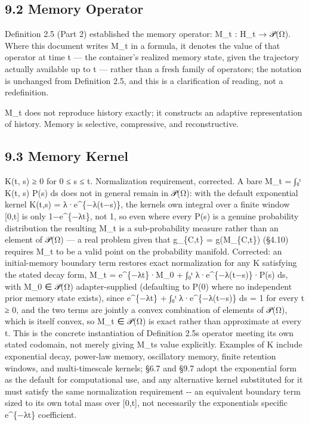 \documentclass[
]{article}
\begin{document}
\hypertarget{memory-operator}{%
\subsection{9.2 Memory Operator}\label{memory-operator}}

Definition 2.5 (Part 2) established the memory operator: M\_t : H\_t →
𝒫(Ω). Where this document writes M\_t in a formula, it denotes the value
of that operator at time t --- the container's realized memory state,
given the trajectory actually available up to t --- rather than a fresh
family of operators; the notation is unchanged from Definition 2.5, and
this is a clarification of reading, not a redefinition.

M\_t does not reproduce history exactly; it constructs an adaptive
representation of history. Memory is selective, compressive, and
reconstructive.

\hypertarget{memory-kernel}{%
\subsection{9.3 Memory Kernel}\label{memory-kernel}}

K(t, s) ≥ 0 for 0 ≤ s ≤ t. Normalization requirement, corrected. A bare
M\_t = ∫₀ᵗ K(t, s) P(s) ds does not in general remain in 𝒫(Ω): with the
default exponential kernel K(t,s) = λ·e\^{}\{−λ(t−s)\}, the
kernel\textquotesingle s own integral over a finite window {[}0,t{]} is
only 1−e\^{}\{−λt\}, not 1, so even where every P(s) is a genuine
probability distribution the resulting M\_t is a sub-probability measure
rather than an element of 𝒫(Ω) --- a real problem given that g\_\{C,t\}
= g(M\_\{C,t\}) (§4.10) requires M\_t to be a valid point on the
probability manifold. Corrected: an initial-memory boundary term
restores exact normalization for any K satisfying the stated decay form,
M\_t = e\^{}\{−λt\}·M\_0 + ∫₀ᵗ λ·e\^{}\{−λ(t−s)\}·P(s) ds, with M\_0 ∈
𝒫(Ω) adapter-supplied (defaulting to P(0) where no independent prior
memory state exists), since e\^{}\{−λt\} + ∫₀ᵗ λ·e\^{}\{−λ(t−s)\} ds = 1
for every t ≥ 0, and the two terms are jointly a convex combination of
elements of 𝒫(Ω), which is itself convex, so M\_t ∈ 𝒫(Ω) is exact rather
than approximate at every t. This is the concrete instantiation of
Definition 2.5\textquotesingle s operator meeting its own stated
codomain, not merely giving M\_t\textquotesingle s value explicitly.
Examples of K include exponential decay, power-law memory, oscillatory
memory, finite retention windows, and multi-timescale kernels; §6.7 and
§9.7 adopt the exponential form as the default for computational use,
and any alternative kernel substituted for it must satisfy the same
normalization requirement -\/- an equivalent boundary term sized to its
own total mass over {[}0,t{]}, not necessarily the
exponential\textquotesingle s specific e\^{}\{−λt\} coefficient.
\end{document}
